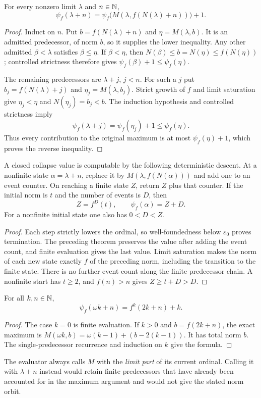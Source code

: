 \begin{theorem}
\label{thm:single-predecessor}
For every nonzero limit $\lambda$ and $n\in\mathbb N$,
\[
 \psi_f(\lambda+n)
   =\psi_f\bigl(M(\lambda,f(N(\lambda)+n))\bigr)+1.
\]
\end{theorem}
\begin{proof}
Induct on $n$.  Put $b=f(N(\lambda)+n)$ and
$\eta=M(\lambda,b)$.  It is an admitted predecessor, of norm $b$,
so it supplies the lower inequality.  Any other admitted $\beta<\lambda$
satisfies $\beta\le\eta$.  If $\beta<\eta$, then
$N(\beta)\le b=N(\eta)\le f(N(\eta))$; controlled strictness
therefore gives $\psi_f(\beta)+1\le\psi_f(\eta)$.

The remaining predecessors are $\lambda+j$, $j<n$.  For such a $j$
put $b_j=f(N(\lambda)+j)$ and $\eta_j=M(\lambda,b_j)$.
Strict growth of $f$ and limit saturation give
$\eta_j<\eta$ and $N(\eta_j)=b_j<b$.
The induction hypothesis and controlled strictness imply
\[
 \psi_f(\lambda+j)=\psi_f(\eta_j)+1\le\psi_f(\eta).
\]
Thus every contribution to the original maximum is at most
$\psi_f(\eta)+1$, which proves the reverse inequality.
\end{proof}

\begin{corollary}
\label{cor:closed-evaluation}
A closed collapse value is computable by the following deterministic
descent.  At a nonfinite state $\alpha=\lambda+n$, replace it by
$M(\lambda,f(N(\alpha)))$ and add one to an event counter.
On reaching a finite state $Z$, return $Z$ plus that counter.
If the initial norm is $t$ and the number of events is $D$, then
\[
 Z=f^D(t),\qquad \psi_f(\alpha)=Z+D.
\]
For a nonfinite initial state one also has $0<D<Z$.
\end{corollary}
\begin{proof}
Each step strictly lowers the ordinal, so well-foundedness below
$\varepsilon_0$ proves termination.  The preceding theorem preserves
the value after adding the event count, and finite evaluation gives the
last value.  Limit saturation makes the norm of each new state exactly
$f$ of the preceding norm, including the transition to the finite state.
There is no further event count along the finite predecessor chain.
A nonfinite start has $t\ge2$, and $f(n)>n$ gives
$Z\ge t+D>D$.
\end{proof}

\begin{corollary}\label{cor:finite-coefficient}
For all $k,n\in\mathbb N$,
\[
 \psi_f(\omega k+n)=f^k(2k+n)+k.
\]
\end{corollary}
\begin{proof}
The case $k=0$ is finite evaluation.  If $k>0$ and
$b=f(2k+n)$, the exact maximum is
$M(\omega k,b)=\omega(k-1)+(b-2(k-1))$.
It has total norm $b$.  The single-predecessor recurrence and induction
on $k$ give the formula.
\end{proof}

The evaluator always calls $M$ with the \emph{limit part} of its
current ordinal.  Calling it with $\lambda+n$ instead would retain
finite predecessors that have already been accounted for in the maximum
argument and would not give the stated norm orbit.
